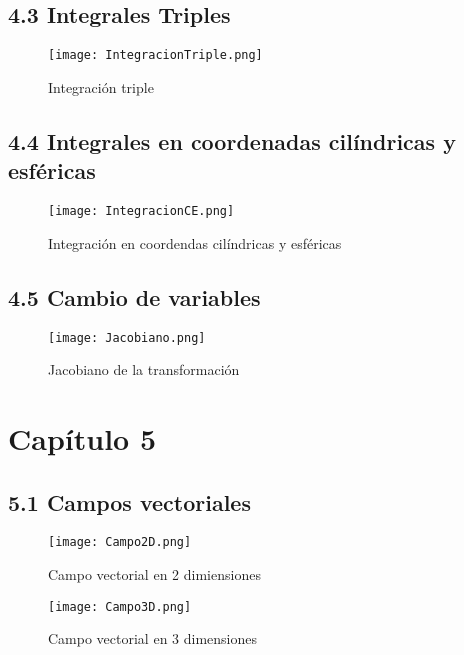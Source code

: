 \documentclass[a4 paper]{article}
\numberwithin{equation}{section}
\newcommand{\0}{\mathbf{0}}
\begin{document}

\subsection*{4.3 Integrales Triples}

\begin{figure}[!ht]
  \centering
      \texttt{[image: IntegracionTriple.png]}
  \caption{Integraci\'on triple}
\end{figure}


\subsection*{4.4 Integrales en coordenadas cil\'indricas y esf\'ericas}

\begin{figure}[!ht]
  \centering
      \texttt{[image: IntegracionCE.png]}
  \caption{Integraci\'on en coordendas cil\'indricas y esf\'ericas}
\end{figure}


\subsection*{4.5 Cambio de variables}

\begin{figure}[!ht]
  \centering
      \texttt{[image: Jacobiano.png]}
  \caption{Jacobiano de la transformaci\'on}
\end{figure}

\section*{Cap\'itulo 5}
\subsection*{5.1 Campos vectoriales}

\begin{figure}[!ht]
  \centering
      \texttt{[image: Campo2D.png]}
  \caption{Campo vectorial en 2 dimiensiones}
\end{figure}
\newpage
\begin{figure}[!ht]
  \centering
      \texttt{[image: Campo3D.png]}
  \caption{Campo vectorial en 3 dimensiones}
\end{figure}
\end{document}
